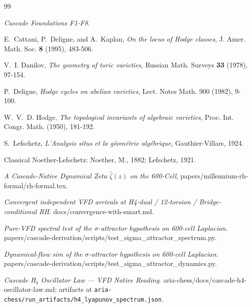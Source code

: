 \documentclass[11pt, a4paper]{amsart}
\theoremstyle{definition}
\begin{document}
\begin{thebibliography}{99}

\emph{Cascade Foundations F1-F8}.

E.~Cattani, P.~Deligne, and A.~Kaplan, \emph{On the locus of Hodge classes},
J. Amer. Math. Soc. \textbf{8} (1995), 483-506.

V.~I. Danilov, \emph{The geometry of toric varieties},
Russian Math. Surveys \textbf{33} (1978), 97-154.

P.~Deligne, \emph{Hodge cycles on abelian varieties},
Lect. Notes Math. 900 (1982), 9-100.

W.~V.~D. Hodge, \emph{The topological invariants of algebraic varieties},
Proc. Int. Congr. Math. (1950), 181-192.

S.~Lefschetz, \emph{L'Analysis situs et la géométrie algébrique},
Gauthier-Villars, 1924.

Classical Noether-Lefschetz: Noether, M., 1882; Lefschetz, 1921.

\emph{A Cascade-Native Dynamical Zeta $\widehat\zeta(z)$ on the
600-Cell}, papers/millennium-rh-formal/rh-formal.tex.

\emph{Convergent independent VFD arrivals at H4-dual / 12-torsion /
Bridge-conditional RH}. docs/convergence-with-smart.md.

\emph{Pure-VFD spectral test of the $\sigma$-attractor hypothesis on
600-cell Laplacian}.
papers/cascade-derivation/scripts/test\_sigma\_attractor\_spectrum.py.

\emph{Dynamical-flow sim of the $\sigma$-attractor hypothesis on
600-cell Laplacian}.
papers/cascade-derivation/scripts/test\_sigma\_attractor\_dynamics.py.

\emph{Cascade H$_4$ Oscillator Law — VFD Native Reading}.
aria-chess/docs/cascade-h4-oscillator-law.md;
artifacts at \texttt{aria-chess/run\_artifacts/h4\_lyapunov\_spectrum.json}.

\end{thebibliography}
\end{document}
